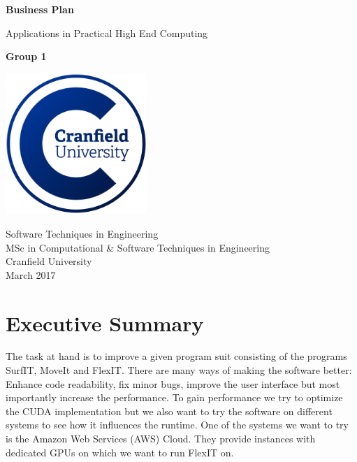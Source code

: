 \documentclass[11pt]{article}
\begin{document}
\begin{titlepage}
    \begin{center}
        \vspace*{1cm}
        
        {\huge\textbf{Business Plan}
        
        \vspace{0.5cm}
        { \Large Applications in Practical High End Computing }
        
        \vspace{1.5cm}
        
        \textbf{Group 1}}
        
        \vfill
        
        
        \vspace{0.8cm}
        
        \includegraphics[width=0.4\textwidth]{images/cranfield}
        
        Software Techniques in Engineering \\
        MSc in Computational \& Software Techniques in Engineering \\
        Cranfield University\\
        March 2017
        
    \end{center}
\end{titlepage}


\section*{Executive Summary}

The task at hand is to improve a given program suit consisting of the programs SurfIT, MoveIt and FlexIT.
There are many ways of making the software better: Enhance code readability, fix minor bugs, improve the user interface but most importantly increase the performance. To gain performance we try to optimize the CUDA implementation but we also want to try the software on different systems to see how it influences the runtime. One of the systems we want to try is the Amazon Web Services (AWS) Cloud. They provide instances with dedicated GPUs on which we want to run FlexIT on. 
\end{document}
